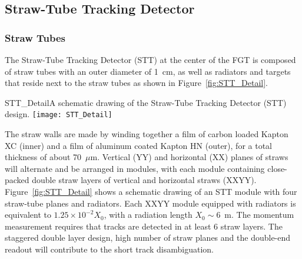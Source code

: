 


\subsection{Straw-Tube Tracking Detector}
\label{cdrsec:detectors-nd-ref-fgt-stt}


\subsubsection{Straw Tubes} 

The Straw-Tube Tracking Detector (STT) at the center of the FGT 
is composed of straw tubes with an outer diameter of 1~cm, as well as 
radiators and targets that reside next to the straw tubes as shown in Figure~\ref{fig:STT_Detail}.
\begin{cdrfigure}
{STT_Detail}{A schematic drawing of the Straw-Tube Tracking Detector (STT) design.}
\texttt{[image: STT\_Detail]}
\end{cdrfigure}

The straw walls are made by winding together a film of carbon loaded
Kapton XC (inner) and a film of aluminum coated Kapton HN (outer), for
a total thickness of about 70~$\mu$m.  Vertical (YY) and horizontal
(XX) planes of straws will alternate and be arranged in modules, with
each module containing close-packed double straw layers of vertical
and horizontal straws (XXYY).  Figure~\ref{fig:STT_Detail} shows a
schematic drawing of an STT module with four straw-tube planes and
radiators. Each XXYY module equipped with radiators is equivalent to
$1.25 \times 10^{-2} X_0$, with a radiation length $X_0\sim$6~m. The
momentum measurement requires that tracks are detected in at least 6
straw layers. The staggered double layer design, high 
number of straw planes and the double-end readout
will contribute to the short track disambiguation.


